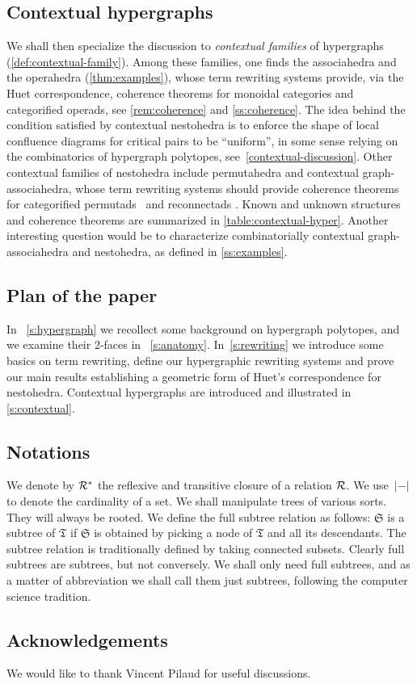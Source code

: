 \subsection*{Contextual hypergraphs}

We shall then specialize the discussion to \emph{contextual families} of hypergraphs (\cref{def:contextual-family}). 
Among these families, one finds the associahedra and the operahedra (\cref{thm:examples}), whose term rewriting systems provide, via the Huet correspondence, coherence theorems for monoidal categories and categorified operads, see \cref{rem:coherence} and \cref{ss:coherence}.  
The idea behind the condition satisfied by contextual nestohedra is to enforce the shape of local confluence diagrams for critical pairs to be ``uniform'', in some sense relying on the combinatorics of hypergraph polytopes, see~\cref{contextual-discussion}.
Other contextual families of nestohedra include permutahedra and contextual graph-associahedra, whose term rewriting systems should provide coherence theorems for categorified permutads~\cite{LodayRonco11,Markl19} and reconnectads \cite{DotsenkoKeilthyLyskov}.
Known and unknown structures and coherence theorems are summarized in \cref{table:contextual-hyper}.
Another interesting question would be to characterize combinatorially contextual graph-associahedra and nestohedra, as defined in \cref{ss:examples}. 

\subsection*{Plan of the paper}
In~ \cref{s:hypergraph} we recollect some background on hypergraph polytopes, and we examine their 2-faces in~ \cref{s:anatomy}.
In~\cref{s:rewriting} we introduce some basics on term rewriting, define our hypergraphic rewriting systems and prove our main results establishing a geometric form of Huet's correspondence for nestohedra.
Contextual hypergraphs are introduced and illustrated in  \cref{s:contextual}.

\subsection*{Notations}

We denote by ${\cal R}^*$ the reflexive and transitive closure of a relation ${\cal R}$. 
We use~$|-|$ to denote the cardinality of a set.
We shall manipulate trees of various sorts. They will always be rooted.  We define the  full subtree relation as follows: $\mathfrak{S}$
is a subtree of $\mathfrak{T}$ if $\mathfrak{S}$ is obtained by picking a node of $\mathfrak{T}$ and all its descendants. The subtree relation is traditionally defined by taking connected subsets. Clearly full subtrees are subtrees, but not conversely. We shall only need full subtrees, and as a matter of abbreviation we shall call them just subtrees, following the computer science tradition.

\subsection*{Acknowledgements}
We would like to thank Vincent Pilaud for useful discussions.

